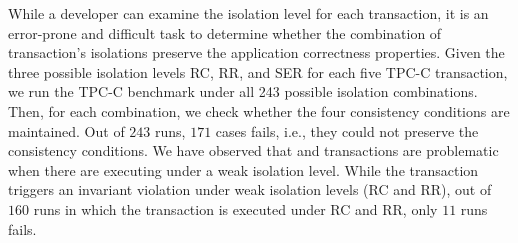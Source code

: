


While a developer can examine the isolation level for each transaction, it is 
an error-prone and difficult task to  determine  whether   the 
combination of  transaction's isolations  preserve the application correctness properties.     
Given  the three possible  isolation levels RC, RR, and SER for each five  TPC-C transaction,  
we  run  the TPC-C benchmark  under all 243  possible   isolation combinations.  Then, 
 for each combination, we  check whether  the four consistency conditions are maintained. 
Out of $243$ runs, $171$ cases fails, i.e., they could not preserve the consistency conditions.  
We have observed that  and  transactions are  problematic when 
there are executing under a weak isolation level. 
While the    transaction triggers an  invariant violation  under  weak isolation levels  (RC and RR),  
out of $160$ runs in which   the    transaction is 
executed under  RC and RR, only $11$ runs 
fails. 



